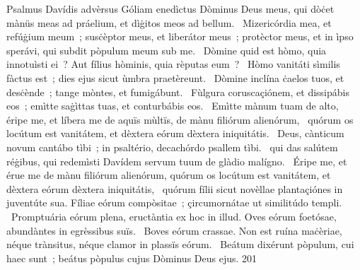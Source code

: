 { Psalmus Davídis advèrsus Góliam}
{%
enedìctus Dòminus Deus meus, qui dòċet mànüs meas ad práelium, et dìġitos meos ad bellum. 
~Mizericórdia mea, et refúġium meum~; susċèptor meus, et liberátor meus~; protèctor meus, et in ìpso sperávi, qui subdit pòpulum meum sub me. 
~Dòmine quid est hòmo, quia innotuìsti ei~? Aut fílius hòminis, quia rèputas eum~? 
~Hòmo vanitáti sìmilis fàctus est~; dies ejus sicut ùmbra praetèreunt. 
~Dòmine inclína ċaelos tuos, et desċènde~; tange mòntes, et fumigábunt. 
~Fùlgura coruscaçiónem, et dissipábis eos~; emìtte saġìttas tuas, et conturbábis eos. 
~Emìtte mànum tuam de alto, éripe me, et líbera me de aquïs mùltïs, de mànu filiórum alienórum, 
~quórum os locútum est vanitátem, et dèxtera eórum dèxtera iniquitátis. 
~Deus, cànticum novum cantábo tìbi~; in psaltério, decachórdo psallem tìbi. 
~qui das salútem réġibus, qui redemìsti Davídem servum tuum de glàdio malígno. 
~Éripe me, et érue me de mànu filiórum alienórum, quórum os locútum est vanitátem, et dèxtera eórum dèxtera iniquitátis, 
~quórum fílii sicut novèllae plantaçiónes in juventúte sua. Fíliae eórum compòsitae~; çircumornátae ut similitúdo templi. 
~Promptuária eórum plena, eructàntia ex hoc in illud. Oves eórum foetósae, abundàntes in egrèssibus suïs. 
~Boves eórum crassae. Non est ruína maċèriae, néque trànsitus, néque clamor in plassïs eórum. 
~Beátum dixérunt pòpulum, cui haec sunt~; beátus pòpulus cujus Dòminus Deus ejus. 
}
{20}{1}
